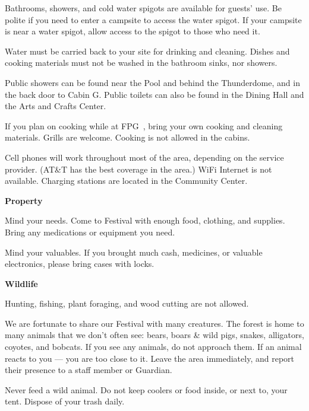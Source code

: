 \documentclass[9pt,twoside,openright,final,article]{memoir}
\def\fpg{{\beltanefamily FPG\ }}
\renewcommand{\subsection}[1]{%
  \vspace{6pt}%
  \needspace{1.25in}%
  \begin{center}\textbf{\Large \beltanefamily #1}\end{center}

  \nopagebreak}
\begin{document}
\begin{multicols}{2}
  Bathrooms, showers, and cold water spigots are available for guests'
  use. Be polite if you need to enter a campsite to access the water
  spigot. If your campsite is near a water spigot, allow access to the
  spigot to those who need it.

  Water must be carried back to your site for drinking and
  cleaning. Dishes and cooking materials must not be washed in the
  bathroom sinks, nor showers.

  Public showers can be found near the Pool and behind the
  Thunderdome, and in the back door to Cabin G. Public toilets can
  also be found in the Dining Hall and the Arts and Crafts Center.

  If you plan on cooking while at \fpg, bring your own cooking and
  cleaning materials. Grills are welcome. Cooking is not allowed in the
  cabins.

  Cell phones will work throughout most of the area, depending on the
  service provider. (AT\&T has the best coverage in the area.) WiFi
  Internet is not available. Charging stations are located in the
  Community Center.


  \subsection{Property}

  Mind your needs. Come to Festival with enough food, clothing, and
  supplies. Bring any medications or equipment you need.

  Mind your valuables. If you brought much cash, medicines, or
  valuable electronics, please bring cases with locks.


  \subsection{Wildlife}

  Hunting, fishing, plant foraging, and wood cutting are not allowed.

  We are fortunate to share our Festival with many creatures. The
  forest is home to many animals that we don't often see: bears, boars
  \& wild pigs, snakes, alligators, coyotes, and bobcats. If you see any
  animals, do not approach them. If an animal reacts to you --- you are
  too close to it. Leave the area immediately, and report their presence
  to a staff member or Guardian.

  Never feed a wild animal. Do not keep coolers or food inside, or
  next to, your tent. Dispose of your trash daily.


\end{multicols}
\end{document}
